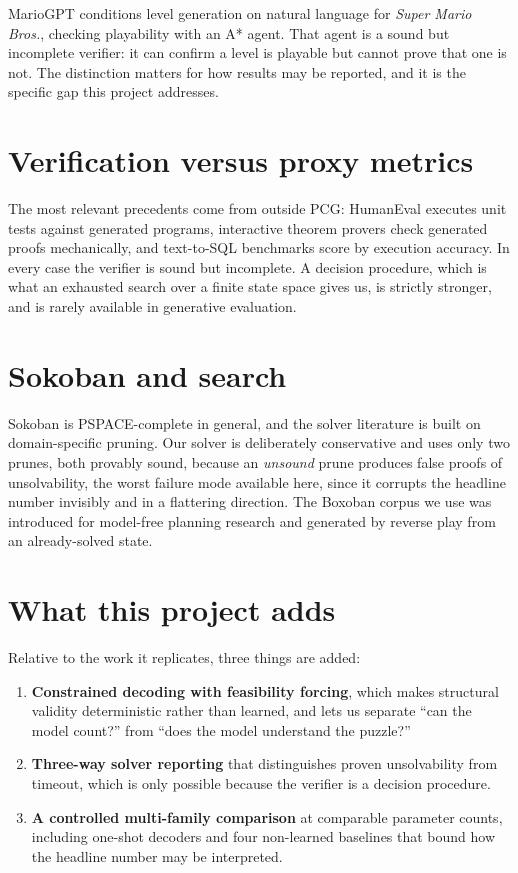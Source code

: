 \documentclass[11pt,a4paper]{report}
\begin{document}
MarioGPT conditions level generation on natural language for \emph{Super Mario
Bros.}, checking playability with an A* agent. That agent is a sound but
incomplete verifier: it can confirm a level is playable but cannot prove that
one is not. The distinction matters for how results may be reported, and it is
the specific gap this project addresses.

\section{Verification versus proxy metrics}

The most relevant precedents come from outside PCG: HumanEval executes unit
tests against generated programs, interactive theorem provers check generated
proofs mechanically, and text-to-SQL benchmarks score by execution accuracy. In
every case the verifier is sound but incomplete. A decision procedure, which is what
an exhausted search over a finite state space gives us, is strictly stronger,
and is rarely available in generative evaluation.

\section{Sokoban and search}

Sokoban is PSPACE-complete in general, and the solver literature is built on
domain-specific pruning. Our solver is deliberately conservative and uses only
two prunes, both provably sound, because an \emph{unsound} prune produces false
proofs of unsolvability, the worst failure mode available here, since it
corrupts the headline number invisibly and in a flattering direction. The
Boxoban corpus we use was introduced for model-free planning research and
generated by reverse play from an already-solved state.

\section{What this project adds}

Relative to the work it replicates, three things are added:

\begin{enumerate}[leftmargin=1.5em,itemsep=2pt]
\item \textbf{Constrained decoding with feasibility forcing}, which makes
      structural validity deterministic rather than learned, and lets us
      separate ``can the model count?'' from ``does the model understand the
      puzzle?''
\item \textbf{Three-way solver reporting} that distinguishes proven
      unsolvability from timeout, which is only possible because the verifier is
      a decision procedure.
\item \textbf{A controlled multi-family comparison} at comparable parameter
      counts, including one-shot decoders and four non-learned baselines that
      bound how the headline number may be interpreted.
\end{enumerate}
\end{document}
